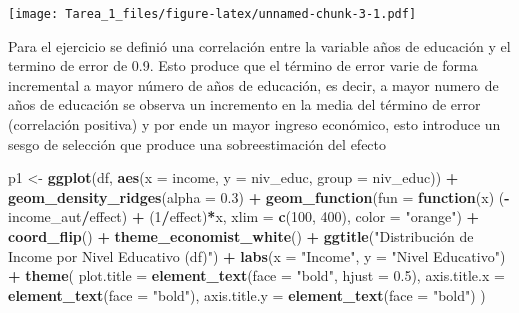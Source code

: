 \documentclass[
]{article}
\newenvironment{Shaded}{\begin{snugshade}}{\end{snugshade}}
\newcommand{\AttributeTok}[1]{\textcolor[rgb]{0.13,0.29,0.53}{#1}}
\newcommand{\ControlFlowTok}[1]{\textcolor[rgb]{0.13,0.29,0.53}{\textbf{#1}}}
\newcommand{\DecValTok}[1]{\textcolor[rgb]{0.00,0.00,0.81}{#1}}
\newcommand{\FloatTok}[1]{\textcolor[rgb]{0.00,0.00,0.81}{#1}}
\newcommand{\FunctionTok}[1]{\textcolor[rgb]{0.13,0.29,0.53}{\textbf{#1}}}
\newcommand{\NormalTok}[1]{#1}
\newcommand{\OtherTok}[1]{\textcolor[rgb]{0.56,0.35,0.01}{#1}}
\newcommand{\SpecialCharTok}[1]{\textcolor[rgb]{0.81,0.36,0.00}{\textbf{#1}}}
\newcommand{\StringTok}[1]{\textcolor[rgb]{0.31,0.60,0.02}{#1}}
\begin{document}
\texttt{[image: Tarea\_1\_files/figure-latex/unnamed-chunk-3-1.pdf]}

Para el ejercicio se definió una correlación entre la variable años de
educación y el termino de error de 0.9. Esto produce que el término de
error varie de forma incremental a mayor número de años de educación, es
decir, a mayor numero de años de educación se observa un incremento en
la media del término de error (correlación positiva) y por ende un mayor
ingreso económico, esto introduce un sesgo de selección que produce una
sobreestimación del efecto

\begin{Shaded}
\begin{Highlighting}[]
\NormalTok{p1 }\OtherTok{\textless{}{-}} \FunctionTok{ggplot}\NormalTok{(df, }\FunctionTok{aes}\NormalTok{(}\AttributeTok{x =}\NormalTok{ income, }\AttributeTok{y =}\NormalTok{ niv\_educ, }\AttributeTok{group =}\NormalTok{ niv\_educ)) }\SpecialCharTok{+}
  \FunctionTok{geom\_density\_ridges}\NormalTok{(}\AttributeTok{alpha =} \FloatTok{0.3}\NormalTok{) }\SpecialCharTok{+}
  \FunctionTok{geom\_function}\NormalTok{(}\AttributeTok{fun =} \ControlFlowTok{function}\NormalTok{(x) (}\SpecialCharTok{{-}}\NormalTok{income\_aut}\SpecialCharTok{/}\NormalTok{effect) }\SpecialCharTok{+}\NormalTok{ (}\DecValTok{1}\SpecialCharTok{/}\NormalTok{effect)}\SpecialCharTok{*}\NormalTok{x, }\AttributeTok{xlim =} \FunctionTok{c}\NormalTok{(}\DecValTok{100}\NormalTok{, }\DecValTok{400}\NormalTok{), }\AttributeTok{color =} \StringTok{"orange"}\NormalTok{) }\SpecialCharTok{+}
  \FunctionTok{coord\_flip}\NormalTok{() }\SpecialCharTok{+}
  \FunctionTok{theme\_economist\_white}\NormalTok{() }\SpecialCharTok{+}
  \FunctionTok{ggtitle}\NormalTok{(}\StringTok{"Distribución de Income por Nivel Educativo (df)"}\NormalTok{) }\SpecialCharTok{+} 
  \FunctionTok{labs}\NormalTok{(}\AttributeTok{x =} \StringTok{"Income"}\NormalTok{, }\AttributeTok{y =} \StringTok{"Nivel Educativo"}\NormalTok{) }\SpecialCharTok{+}
  \FunctionTok{theme}\NormalTok{(}
    \AttributeTok{plot.title =} \FunctionTok{element\_text}\NormalTok{(}\AttributeTok{face =} \StringTok{"bold"}\NormalTok{, }\AttributeTok{hjust =} \FloatTok{0.5}\NormalTok{),}
    \AttributeTok{axis.title.x =} \FunctionTok{element\_text}\NormalTok{(}\AttributeTok{face =} \StringTok{"bold"}\NormalTok{),}
    \AttributeTok{axis.title.y =} \FunctionTok{element\_text}\NormalTok{(}\AttributeTok{face =} \StringTok{"bold"}\NormalTok{)}
\NormalTok{  )}



\end{Highlighting}
\end{Shaded}
\end{document}
